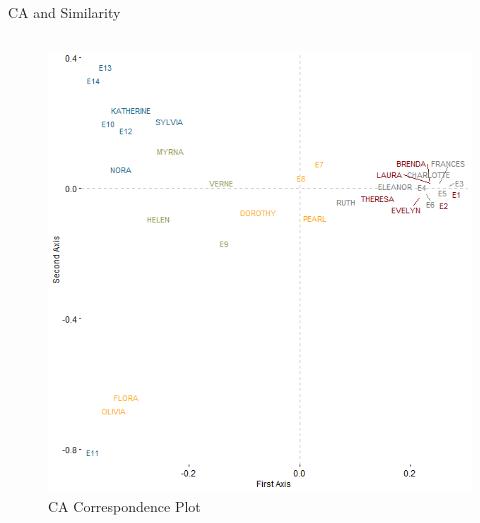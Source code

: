 \documentclass[
  ignorenonframetext,
]{beamer}
\begin{document}
\begin{frame}{CA and Similarity}
\begin{columns}[T]
\begin{column}{0.55\textwidth}
\begin{figure}

{\centering \includegraphics{Plots/ca-corr-plot.png}

}

\caption{CA Correspondence Plot}

\end{figure}
\end{column}
\end{columns}
\end{frame}
\end{document}

